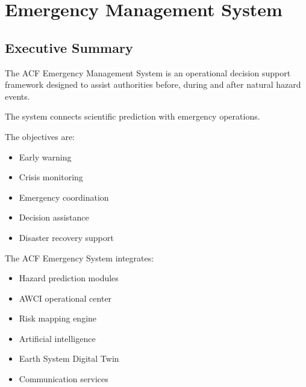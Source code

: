 
\section{Emergency Management System}

\subsection{Executive Summary}

The ACF Emergency Management System is an operational decision support
framework designed to assist authorities before, during and after
natural hazard events.

The system connects scientific prediction with emergency operations.

The objectives are:

\begin{itemize}

\item Early warning

\item Crisis monitoring

\item Emergency coordination

\item Decision assistance

\item Disaster recovery support

\end{itemize}


The ACF Emergency System integrates:

\begin{itemize}

\item Hazard prediction modules

\item AWCI operational center

\item Risk mapping engine

\item Artificial intelligence

\item Earth System Digital Twin

\item Communication services

\end{itemize}


